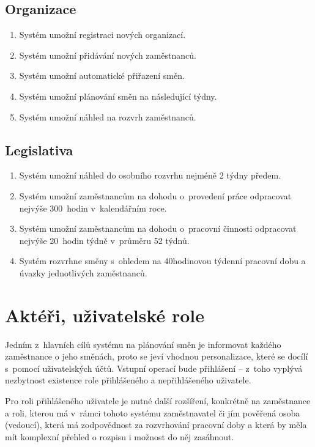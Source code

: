 \documentclass[twoside]{ctuthesis}
\begin{document}
\subsection{Organizace}
\begin{enumerate}[label=\textbf{O\arabic*.}]
	\item Systém umožní registraci nových organizací.
	\item Systém umožní přidávání nových zaměstnanců.
	\item Systém umožní automatické přiřazení směn.
	\item Systém umožní plánování směn na následující týdny.
	\item Systém umožní náhled na rozvrh zaměstnanců.
\end{enumerate}

\subsection{Legislativa}
\begin{enumerate}[label=\textbf{L\arabic*.}]
		\item Systém umožní náhled do osobního rozvrhu nejméně 2 týdny předem.
		\item Systém umožní zaměstnancům na dohodu o~provedení práce odpracovat nejvýše 300~hodin v~kalendářním roce.
		\item Systém umožní zaměstnancům na dohodu o~pracovní činnosti odpracovat nejvýše 20~hodin týdně v~průměru 52 týdnů.
		\item Systém rozvrhne směny s~ohledem na 40hodinovou týdenní pracovní dobu a úvazky jednotlivých zaměstnanců.
\end{enumerate}

\section{Aktéři, uživatelské role}
Jedním z~hlavních cílů systému na plánování směn je informovat každého zaměstnance o jeho směnách, proto se jeví vhodnou personalizace, které se docílí s~pomocí uživatelských účtů. Vstupní operací bude přihlášení -- z~toho vyplývá nezbytnost existence role přihlášeného a nepřihlášeného uživatele.

Pro roli přihlášeného uživatele je nutné další rozšíření, konkrétně na zaměstnance a roli, kterou má v~rámci tohoto systému za\-měst\-na\-va\-tel či jím pověřená osoba (vedoucí), která má zodpovědnost za rozvrhování pracovní doby a která by měla mít komplexní přehled o rozpisu i možnost do něj zasáhnout.
\end{document}
